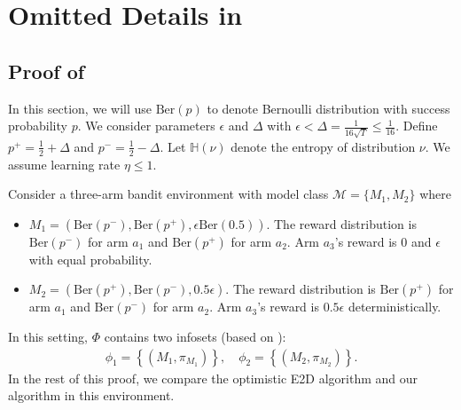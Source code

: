 \newpage
\section{Omitted Details in }\label{app:compare DEC}


\subsection{Proof of }
In this section, we will use $\text{Ber}(p)$ to denote Bernoulli distribution with success probability $p$. We consider parameters $\epsilon$ and $\Delta$ with $\epsilon < \Delta = \frac{1}{16\sqrt{T}} \leq \frac{1}{16}$. Define $p^+ = \frac{1}{2} + \Delta$ and $p^- = \frac{1}{2} - \Delta$. Let $\mathbb{H}(\nu)$ denote the entropy of distribution $\nu$. We assume learning rate $\eta \leq 1$.  

Consider a three-arm bandit environment with model class $\mathcal{M} = \{M_1, M_2\}$ where
\begin{itemize}
    \item $M_1 = \left(\text{Ber}\left(p^-\right), \text{Ber}\left(p^+\right), \epsilon\text{Ber}(0.5)\right)$. The reward distribution is $\text{Ber}\left(p^-\right)$ for arm $a_1$ and   $\text{Ber}\left(p^+\right)$ for arm $a_2$. Arm $a_3$'s reward is $0$ and $\epsilon$ with equal probability. 
    \item $M_2 = \left(\text{Ber}\left(p^+\right), \text{Ber}\left(p^-\right), 0.5\epsilon\right)$. The reward distribution is $\text{Ber}\left(p^+\right)$ for arm $a_1$ and  $\text{Ber}\left(p^-\right)$ for arm $a_2$. Arm $a_3$'s reward is $0.5\epsilon$ deterministically. 
\end{itemize}
In this setting, $\Phi$ contains two infosets (based on ): 
\begin{align*}
    \phi_1 = \left\{\left(M_1, \pi_{M_1}\right)\right\},\quad \phi_2=\left\{\left(M_2, \pi_{M_2}\right)\right\}. 
\end{align*}
In the rest of this proof, we compare the optimistic E2D algorithm \citep{foster2024model} and our algorithm in this environment. 

